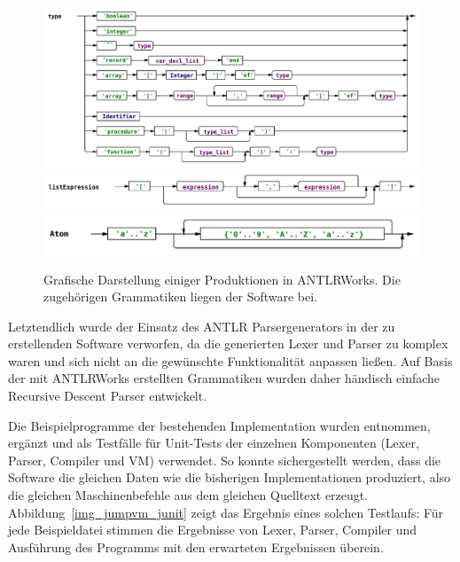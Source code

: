 \documentclass[german, a4paper, parskip, bibliography=totoc]{scrartcl}
\begin{document}
\begin{figure}[htb]
    \centering
    \includegraphics[width=\textwidth]{antlrworks_pama_type.pdf}
    \includegraphics[width=\textwidth]{antlrworks_mama_listexpression.pdf}
    \includegraphics[width=\textwidth]{antlrworks_wima_atom.pdf}
    \caption{Grafische Darstellung einiger Produktionen in ANTLRWorks. Die
        zugehörigen Grammatiken liegen der Software bei.}
    \label{img_antlr}
\end{figure}

Letztendlich wurde der Einsatz des ANTLR Parsergenerators in der zu
erstellenden Software verworfen, da die generierten Lexer und Parser zu komplex
waren und sich nicht an die gewünschte Funktionalität anpassen ließen. Auf
Basis der mit ANTLRWorks erstellten Grammatiken wurden daher händisch einfache
Recursive Descent Parser entwickelt.

Die Beispielprogramme der bestehenden Implementation wurden entnommen,
ergänzt und als Testfälle für Unit-Tests der einzelnen Komponenten (Lexer,
Parser, Compiler und VM) verwendet. So konnte sichergestellt werden, dass die
Software die gleichen Daten wie die bisherigen Implementationen produziert,
also die gleichen Maschinenbefehle aus dem gleichen Quelltext erzeugt.
Abbildung~\ref{img_jumpvm_junit} zeigt das Ergebnis eines solchen Testlaufs:
Für jede Beispieldatei stimmen die Ergebnisse von Lexer, Parser, Compiler und
Ausführung des Programms mit den erwarteten Ergebnissen überein.
\end{document}
